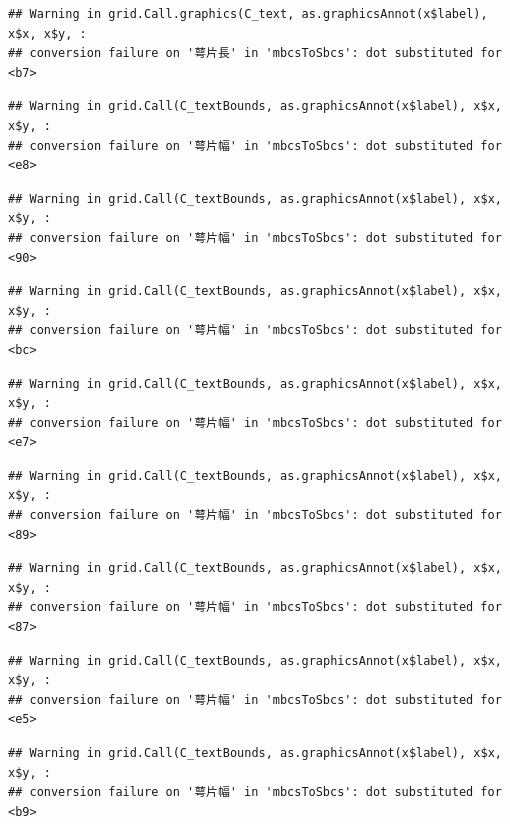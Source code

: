 \documentclass[
]{book}
\begin{document}
\begin{verbatim}
## Warning in grid.Call.graphics(C_text, as.graphicsAnnot(x$label), x$x, x$y, :
## conversion failure on '萼片長' in 'mbcsToSbcs': dot substituted for <b7>
\end{verbatim}

\begin{verbatim}
## Warning in grid.Call(C_textBounds, as.graphicsAnnot(x$label), x$x, x$y, :
## conversion failure on '萼片幅' in 'mbcsToSbcs': dot substituted for <e8>
\end{verbatim}

\begin{verbatim}
## Warning in grid.Call(C_textBounds, as.graphicsAnnot(x$label), x$x, x$y, :
## conversion failure on '萼片幅' in 'mbcsToSbcs': dot substituted for <90>
\end{verbatim}

\begin{verbatim}
## Warning in grid.Call(C_textBounds, as.graphicsAnnot(x$label), x$x, x$y, :
## conversion failure on '萼片幅' in 'mbcsToSbcs': dot substituted for <bc>
\end{verbatim}

\begin{verbatim}
## Warning in grid.Call(C_textBounds, as.graphicsAnnot(x$label), x$x, x$y, :
## conversion failure on '萼片幅' in 'mbcsToSbcs': dot substituted for <e7>
\end{verbatim}

\begin{verbatim}
## Warning in grid.Call(C_textBounds, as.graphicsAnnot(x$label), x$x, x$y, :
## conversion failure on '萼片幅' in 'mbcsToSbcs': dot substituted for <89>
\end{verbatim}

\begin{verbatim}
## Warning in grid.Call(C_textBounds, as.graphicsAnnot(x$label), x$x, x$y, :
## conversion failure on '萼片幅' in 'mbcsToSbcs': dot substituted for <87>
\end{verbatim}

\begin{verbatim}
## Warning in grid.Call(C_textBounds, as.graphicsAnnot(x$label), x$x, x$y, :
## conversion failure on '萼片幅' in 'mbcsToSbcs': dot substituted for <e5>
\end{verbatim}

\begin{verbatim}
## Warning in grid.Call(C_textBounds, as.graphicsAnnot(x$label), x$x, x$y, :
## conversion failure on '萼片幅' in 'mbcsToSbcs': dot substituted for <b9>
\end{verbatim}
\end{document}

